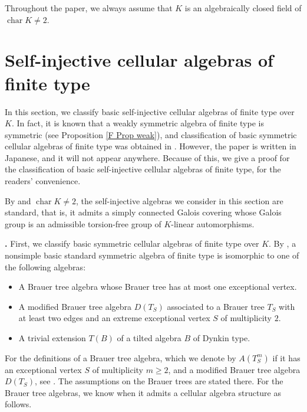 \documentclass[12pt]{amsart}
\def \para{\refstepcounter{thm} \par\medskip\noindent
                \textbf{\thethm .} }
\numberwithin{equation}{thm}
\newcommand\cha{\operatorname{char}}
\newcounter{ni}
\begin{document}
Throughout the paper, 
we always assume that $K$ is an algebraically closed field of $\cha K \not=2$. 




\section{Self-injective cellular algebras of finite type} 
In this section, 
we classify basic self-injective cellular algebras of finite type over $K$. 
In fact, it is known that a weakly symmetric algebra of finite type is symmetric (see Proposition \ref{F Prop weak}), 
and classification of basic symmetric cellular algebras of finite type was obtained in \cite{O}. 
However, the paper \cite{O} is written in Japanese, and it will not appear anywhere. Because of this, 
we give a proof for the classification of basic self-injective cellular algebras of finite type, for the readers' convenience. 

By \cite[Theorem 3.8]{S} and $\cha K \not=2$, the self-injective algebras we consider in this section are standard, 
that is, it admits a simply connected Galois covering whose Galois group is an admissible torsion-free group of $K$-linear automorphisms.


\para 
First, we classify basic symmetric cellular algebras of finite type over $K$. 
By \cite[Theorem 3.11]{S}, 
a nonsimple basic standard symmetric algebra of finite type is isomorphic to one of the following algebras: 
\begin{itemize}
\item 
A Brauer tree algebra whose Brauer tree has at most one exceptional vertex. 

\item 
A modified Brauer tree algebra $D(T_S)$ 
associated to a Brauer tree $T_S$ 
with at least two edges and an extreme exceptional vertex $S$ of multiplicity $2$. 

\item 
A trivial extension $T(B)$ of a tilted algebra $B$ of Dynkin type. 
\end{itemize}
For the definitions of a Brauer tree algebra, which we denote by $A(T^m_S)$ if it has an exceptional vertex $S$ 
of multiplicity $m\ge2$, and a modified Brauer tree algebra $D(T_S)$, 
see \cite[paragraphs 2.8 and 3.6]{S}. The assumptions on the Brauer trees are stated there. 
For the Brauer tree algebras, we know when it admits a cellular algebra structure as follows.
\end{document}
